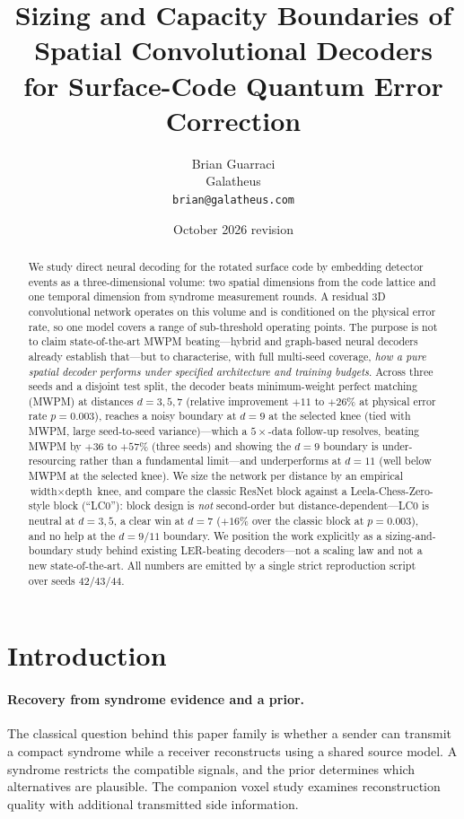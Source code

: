 \documentclass[11pt,a4paper]{article}
\title{Sizing and Capacity Boundaries of\\Spatial Convolutional Decoders\\for Surface-Code Quantum Error Correction}
\author{Brian Guarraci\\
  Galatheus\\
  \texttt{brian@galatheus.com}}
\date{October 2026 revision}
\begin{document}
\maketitle

\begin{abstract}
We study direct neural decoding for the rotated surface code by embedding
detector events as a three-dimensional volume: two spatial dimensions from
the code lattice and one temporal dimension from syndrome measurement
rounds. A residual 3D convolutional network operates on this volume and is
conditioned on the physical error rate, so one model covers a range of
sub-threshold operating points. The purpose is not to claim
state-of-the-art MWPM beating---hybrid and graph-based neural decoders
already establish that---but to characterise, with full multi-seed
coverage, \emph{how a pure spatial decoder performs under specified
architecture and training budgets}.
Across three seeds and a disjoint test split, the decoder beats
minimum-weight perfect matching (MWPM) at distances $d=3,5,7$ (relative
improvement $+11$ to $+26\%$ at physical error rate $p=0.003$), reaches a
noisy boundary at $d=9$ at the selected knee (tied with MWPM, large
seed-to-seed variance)---which a $5\times$-data follow-up resolves, beating MWPM
by $+36$ to $+57\%$ (three seeds) and showing the $d=9$ boundary is
under-resourcing rather than a fundamental limit---and underperforms at
$d=11$ (well below MWPM at the selected knee). We size the network per distance by an empirical
$\textrm{width}\times\textrm{depth}$ knee, and compare the classic ResNet
block against a Leela-Chess-Zero-style block (``LC0''): block design is
\emph{not} second-order but distance-dependent---LC0 is neutral at
$d=3,5$, a clear win at $d=7$ ($+16\%$ over the classic block at
$p=0.003$), and no help at the $d=9/11$ boundary. We position the work
explicitly as a sizing-and-boundary study behind existing LER-beating
decoders---not a scaling law and not a new state-of-the-art. All numbers
are emitted by a single strict reproduction script over seeds 42/43/44.
\end{abstract}

\section{Introduction}

\paragraph{Recovery from syndrome evidence and a prior.}
The classical question behind this paper family is whether a sender can
transmit a compact syndrome while a receiver reconstructs using a shared
source model. A syndrome restricts the compatible signals, and the prior
determines which alternatives are plausible. The companion voxel study
examines reconstruction quality with additional transmitted side information.
\end{document}

